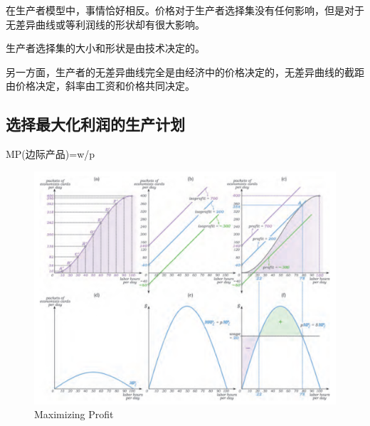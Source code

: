 \documentclass{article}
\begin{document}
在生产者模型中，事情恰好相反。价格对于生产者选择集没有任何影响，但是对于无差异曲线或等利润线的形状却有很大影响。

生产者选择集的大小和形状是由技术决定的。

另一方面，生产者的无差异曲线完全是由经济中的价格决定的，无差异曲线的截距由价格决定，斜率由工资和价格共同决定。

\subsection{选择最大化利润的生产计划}

MP(边际产品)=w/p

\begin{figure}[H] %
	\centering %
	\includegraphics[width=1\textwidth]{11_3} %
	\caption{Maximizing Profit} %
	\label{Fig.main4} %
\end{figure}
\end{document}

